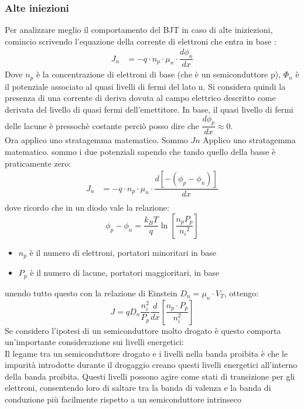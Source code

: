 \subsubsection{Alte iniezioni}
Per analizzare meglio il comportamento del BJT in caso di alte iniziezioni, comincio scrivendo l'equazione della corrente di elettroni che entra in base :
\begin{align}
    J_n &=-q\cdot n_p \cdot \mu_n \cdot \dfrac{d\phi_n}{dx}
\end{align}
Dove $n_p$ è la concentrazione di elettroni di base (che è un semiconduttore p), $\Phi_n$ è il potenziale associato al quasi livelli di fermi del lato n. Si considera quindi la presenza di una corrente di deriva dovuta al campo elettrico descritto come derivata del livello di quasi fermi dell'emettitore.
In base, il quasi livello di fermi delle lacune è pressochè costante perciò posso dire che $\dfrac{d\phi_p}{dx} \approx 0$.\\
Ora applico uno stratagemma matematico. Sommo $Jn$
Applico uno stratagemma matematico. sommo i due potenziali sapendo che tando quello della basse è praticamente zero:
%
\begin{align}
    J_n &=-q\cdot n_p \cdot \mu_n \cdot \dfrac{d[-(\phi_p-\phi_n)]}{dx}\\
\end{align}
%
dove ricordo che in un diodo vale la relazione:
%
\begin{equation}
    \phi_p -\phi_n = \dfrac{k_B T}{q}\ln{\left[  \dfrac{n_p P_p}{{n_i}^2}\right]}
\end{equation}
\begin{exbox}
    \begin{itemize}
        \item $n_p$ è il numero di elettroni, portatori minoritari in base
        \item $P_p$ è il numero di lacune, portatori maggioritari, in base
    \end{itemize}
\end{exbox}
%
unendo tutto questo con la relazione di Einstein $D_n = \mu_n \cdot V_T$, ottengo: 
%
\begin{equation}
    J = q D_n \dfrac{n_i^2}{P_p} \dfrac{d}{dx}\left[ \dfrac{n_p \cdot P_p}{n_i^2}\right]
\end{equation}
%
Se considero l'ipotesi di un semiconduttore molto drogato è questo comporta un'importante considerazione sui livelli energetici:\\
Il legame tra un semiconduttore drogato e i livelli nella banda proibita è che le impurità introdotte durante il drogaggio creano questi livelli energetici all'interno della banda proibita. Questi livelli possono agire come stati di transizione per gli elettroni, consentendo loro di saltare tra la banda di valenza e la banda di conduzione più facilmente rispetto a un semiconduttore intrinseco
